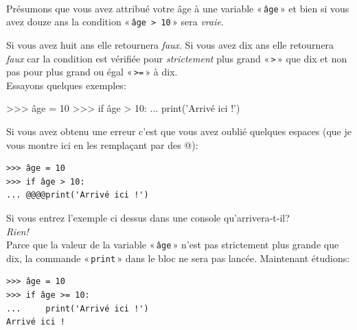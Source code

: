 \\


Présumons que vous avez attribué votre âge à une variable « \texttt{âge} »  et bien si vous avez douze ans la condition « \texttt{âge > 10} » sera \emph{vraie}.

Si vous avez huit ans elle retournera \emph{faux}.
Si vous avez dix ans elle retournera \emph{faux} car la condition est vérifiée pour \emph{strictement} plus grand « \texttt{>} »  que dix et non pas pour plus grand ou égal « \texttt{>=} » à dix.\\

Essayons quelques exemples:

\begin{Verbatim*}[frame=single,rulecolor=\color{green}, label=à taper avec attention]
>>> âge = 10
>>> if âge > 10:
...     print('Arrivé ici !')
\end{Verbatim*}

Si vous avez obtenu une erreur c'est que vous avez oublié quelques espaces (que je vous montre ici en les remplaçant par des @):

\begin{Verbatim}[frame=single,rulecolor=\color{gray}, label=ne pas saisir]
>>> âge = 10
>>> if âge > 10:
... @@@@print('Arrivé ici !')
\end{Verbatim}

Si vous entrez l'exemple ci dessus dans une console qu'arrivera-t-il?\\

\emph{Rien!}\\

Parce que la valeur de la variable « \texttt{âge} » n'est pas strictement plus grande que dix, la commande « \texttt{print} » dans le bloc ne sera pas lancée. Maintenant étudions:

\begin{Verbatim}[frame=single,rulecolor=\color{green}, label=à taper avec attention]
>>> âge = 10
>>> if âge >= 10:
...     print('Arrivé ici !')
Arrivé ici !
\end{Verbatim}

